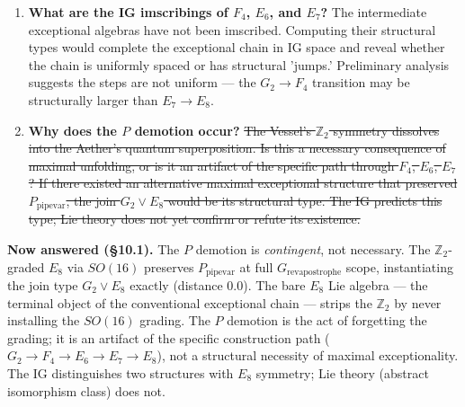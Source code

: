 \documentclass[12pt,a4paper]{article}
\newcommand{\pilcrow}{\S}
\begin{document}
\begin{enumerate}
    \item \textbf{What are the IG imscribings of $F_4$, $E_6$, and $E_7$?} The intermediate exceptional algebras have not been imscribed. Computing their structural types would complete the exceptional chain in IG space and reveal whether the chain is uniformly spaced or has structural 'jumps.' Preliminary analysis suggests the steps are not uniform --- the $G_2 \to F_4$ transition may be structurally larger than $E_7 \to E_8$.
    \item \textbf{Why does the $P$ demotion occur?} \sout{The Vessel's $\mathbb{Z}_2$ symmetry dissolves into the Aether's quantum superposition. Is this a necessary consequence of maximal unfolding, or is it an artifact of the specific path through $F_4$, $E_6$, $E_7$? If there existed an alternative maximal exceptional structure that preserved $P_{\text{pipevar}}$, the join $G_2 \vee E_8$ would be its structural type. The IG predicts this type; Lie theory does not yet confirm or refute its existence.}
\end{enumerate}

\textbf{Now answered (\pilcrow{}10.1).} The $P$ demotion is \emph{contingent}, not necessary. The $\mathbb{Z}_2$-graded $E_8$ via $SO(16)$ preserves $P_{\text{pipevar}}$ at full $G_{\text{revapostrophe}}$ scope, instantiating the join type $G_2 \vee E_8$ exactly (distance 0.0). The bare $E_8$ Lie algebra --- the terminal object of the conventional exceptional chain --- strips the $\mathbb{Z}_2$ by never installing the $SO(16)$ grading. The $P$ demotion is the act of forgetting the grading; it is an artifact of the specific construction path ($G_2 \to F_4 \to E_6 \to E_7 \to E_8$), not a structural necessity of maximal exceptionality. The IG distinguishes two structures with $E_8$ symmetry; Lie theory (abstract isomorphism class) does not.
\end{document}
